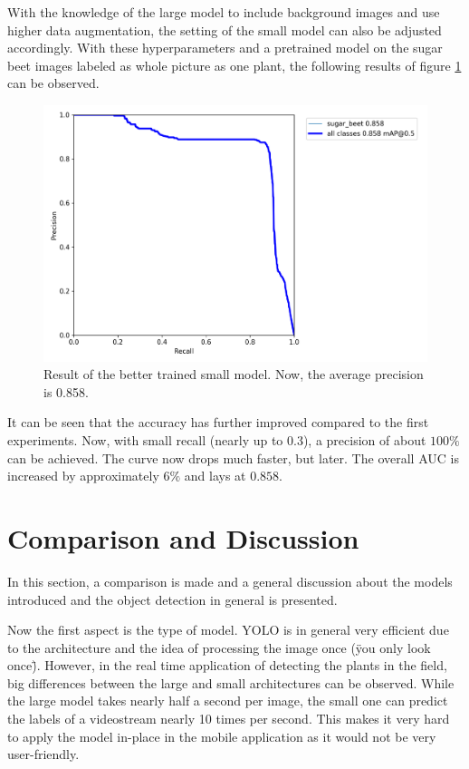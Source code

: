 With the knowledge of the large model to include background images and use higher data augmentation, the setting of the small model can also be adjusted accordingly. With these hyperparameters and a pretrained model on the sugar beet images labeled as whole picture as one plant, the following results of figure \ref{fig:result_small_one} can be observed. 

\begin{figure}[htb!]
	\centering
	\includegraphics[scale=0.12]{figures/result_small.png}
	\caption{Result of the better trained small model. Now, the average precision is 0.858.}
	\label{fig:result_small_one}
\end{figure}

It can be seen that the accuracy has further improved compared to the first experiments. Now, with small recall (nearly up to 0.3), a precision of about $ 100\% $ can be achieved. The curve now drops much faster, but later. The overall AUC is increased by approximately $ 6\% $ and lays at $ 0.858 $.

\section{Comparison and Discussion}
In this section, a comparison is made and a general discussion about the models introduced and the object detection in general is presented.

Now the first aspect is the type of model. YOLO is in general very efficient due to the architecture and the idea of processing the image once (\"you only look once\"). However, in the real time application of detecting the plants in the field, big differences between the large and small architectures can be observed. While the large model takes nearly half a second per image, the small one can predict the labels of a videostream nearly 10 times per second. This makes it very hard to apply the model in-place in the mobile application as it would not be very user-friendly.

